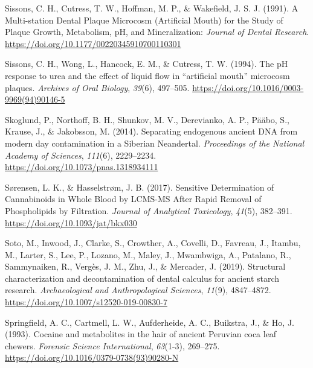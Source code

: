 \documentclass[
  b5paper,
]{book}
\newlength{\cslhangindent}
\newlength{\cslentryspacingunit} %
\newenvironment{CSLReferences}[2] %
 {%
  \setlength{\parindent}{0pt}
  \ifodd #1
  \let\oldpar\par
  \def\par{\hangindent=\cslhangindent\oldpar}
  \fi
  \setlength{\parskip}{#2\cslentryspacingunit}
 }%
 {}
\begin{document}
\begin{CSLReferences}{1}{0}
\leavevmode{}%
Sissons, C. H., Cutress, T. W., Hoffman, M. P., \& Wakefield, J. S. J.
(1991). A {Multi-station Dental Plaque Microcosm} ({Artificial Mouth})
for the {Study} of {Plaque Growth}, {Metabolism}, {pH}, and
{Mineralization}: \emph{Journal of Dental Research}.
\url{https://doi.org/10.1177/00220345910700110301}

\leavevmode{}%
Sissons, C. H., Wong, L., Hancock, E. M., \& Cutress, T. W. (1994). The
{pH} response to urea and the effect of liquid flow in {``artificial
mouth''} microcosm plaques. \emph{Archives of Oral Biology},
\emph{39}(6), 497--505.
\url{https://doi.org/10.1016/0003-9969(94)90146-5}

\leavevmode{}%
Skoglund, P., Northoff, B. H., Shunkov, M. V., Derevianko, A. P., Pääbo,
S., Krause, J., \& Jakobsson, M. (2014). Separating endogenous ancient
{DNA} from modern day contamination in a {Siberian Neandertal}.
\emph{Proceedings of the National Academy of Sciences}, \emph{111}(6),
2229--2234. \url{https://doi.org/10.1073/pnas.1318934111}

\leavevmode{}%
Sørensen, L. K., \& Hasselstrøm, J. B. (2017). Sensitive {Determination}
of {Cannabinoids} in {Whole Blood} by {LC}{\textendash}{MS-MS After
Rapid Removal} of {Phospholipids} by {Filtration}. \emph{Journal of
Analytical Toxicology}, \emph{41}(5), 382--391.
\url{https://doi.org/10.1093/jat/bkx030}

\leavevmode{}%
Soto, M., Inwood, J., Clarke, S., Crowther, A., Covelli, D., Favreau,
J., Itambu, M., Larter, S., Lee, P., Lozano, M., Maley, J., Mwambwiga,
A., Patalano, R., Sammynaiken, R., Vergès, J. M., Zhu, J., \& Mercader,
J. (2019). Structural characterization and decontamination of dental
calculus for ancient starch research. \emph{Archaeological and
Anthropological Sciences}, \emph{11}(9), 4847--4872.
\url{https://doi.org/10.1007/s12520-019-00830-7}

\leavevmode{}%
Springfield, A. C., Cartmell, L. W., Aufderheide, A. C., Buikstra, J.,
\& Ho, J. (1993). Cocaine and metabolites in the hair of ancient
{Peruvian} coca leaf chewers. \emph{Forensic Science International},
\emph{63}(1-3), 269--275.
\url{https://doi.org/10.1016/0379-0738(93)90280-N}


\end{CSLReferences}
\end{document}
